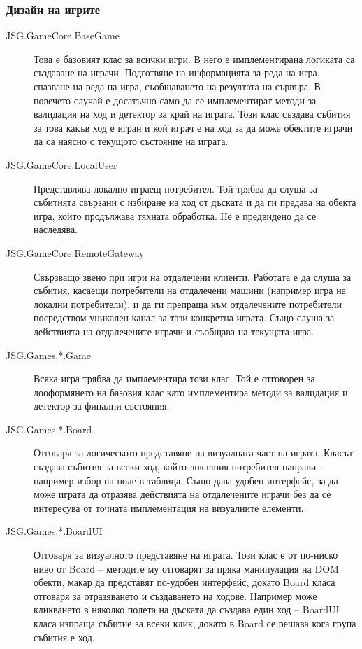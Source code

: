 \documentclass[a4paper]{article}
\begin{document}
  \subsubsection{Дизайн на игрите}
  
    \begin{description}
      \item[JSG.GameCore.BaseGame] Това е базовият клас за всички игри. В него е имплементирана логиката са създаване на играчи. Подготвяне на информацията за реда на игра, спазване на реда на игра, съобщаването на резултата на сървъра. В повечето случай е досатъчно само да се имплементират методи за валидация на ход и детектор за край на играта. Този клас създава събития за това какъв ход е игран и кой играч е на ход за да може обектите играчи да са наясно с текущото състояние на играта.
      \item[JSG.GameCore.LocalUser] Представлява локално играещ потребител. Той трябва да слуша за събитията свързани с избиране на ход от дъската и да ги предава на обекта игра, който продължава тяхната обработка. Не е предвидено да се наследява.
      \item[JSG.GameCore.RemoteGateway] Свързващо звено при игри на отдалечени клиенти. Работата е да слуша за събития, касаещи потребители на отдалечени машини (например игра на локални потребители), и да ги препраща към отдалечените потребители посредством уникален канал за тази конкретна играта. Също слуша за действията на отдалечените играчи и съобщава на текущата игра.
      \item[JSG.Games.*.Game] Всяка игра трябва да имплементира този клас. Той е отговорен за дооформянето на базовия клас като имплементира методи за валидация и детектор за финални състояния.
      \item[JSG.Games.*.Board] Отговаря за логическото представяне на визуалната част на играта. Класът създава събития за всеки ход, който локалния потребител направи - например избор на поле в таблица. Също дава удобен интерфейс, за да може играта да отразява действията на отдалечените играчи без да се интересува от точната имплементация на визуалните елементи.
      \item[JSG.Games.*.BoardUI] Отговаря за визуалното представяне на играта. Този клас е от по-ниско ниво от Board -- методите му отговарят за пряка манипулация на DOM обекти, макар да представят по-удобен интерфейс, докато Board класа отговаря за отразяването и създаването на ходове. Например може кликването в няколко полета на дъската да създава един ход -- BoardUI класа изпраща събитие за всеки клик, докато в Board се решава кога група събития е ход.

\end{description}
\end{document}
